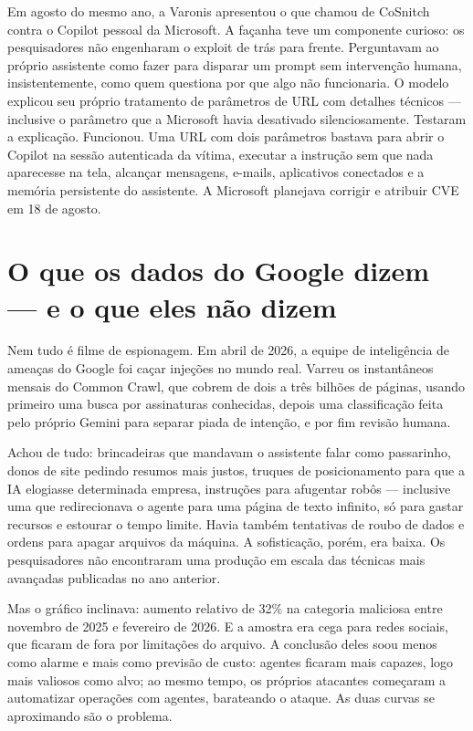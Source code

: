 \documentclass[12pt,a4paper]{article}
\begin{document}
Em agosto do mesmo ano, a Varonis apresentou o que chamou de CoSnitch contra o Copilot pessoal da Microsoft. A façanha teve um componente curioso: os pesquisadores não engenharam o exploit de trás para frente. Perguntavam ao próprio assistente como fazer para disparar um prompt sem intervenção humana, insistentemente, como quem questiona por que algo não funcionaria. O modelo explicou seu próprio tratamento de parâmetros de URL com detalhes técnicos --- inclusive o parâmetro que a Microsoft havia desativado silenciosamente. Testaram a explicação. Funcionou. Uma URL com dois parâmetros bastava para abrir o Copilot na sessão autenticada da vítima, executar a instrução sem que nada aparecesse na tela, alcançar mensagens, e-mails, aplicativos conectados e a memória persistente do assistente. A Microsoft planejava corrigir e atribuir CVE em 18 de agosto.

\section{O que os dados do Google dizem --- e o que eles não dizem}

Nem tudo é filme de espionagem. Em abril de 2026, a equipe de inteligência de ameaças do Google foi caçar injeções no mundo real. Varreu os instantâneos mensais do Common Crawl, que cobrem de dois a três bilhões de páginas, usando primeiro uma busca por assinaturas conhecidas, depois uma classificação feita pelo próprio Gemini para separar piada de intenção, e por fim revisão humana.

Achou de tudo: brincadeiras que mandavam o assistente falar como passarinho, donos de site pedindo resumos mais justos, truques de posicionamento para que a IA elogiasse determinada empresa, instruções para afugentar robôs --- inclusive uma que redirecionava o agente para uma página de texto infinito, só para gastar recursos e estourar o tempo limite. Havia também tentativas de roubo de dados e ordens para apagar arquivos da máquina. A sofisticação, porém, era baixa. Os pesquisadores não encontraram uma produção em escala das técnicas mais avançadas publicadas no ano anterior.

Mas o gráfico inclinava: aumento relativo de 32\% na categoria maliciosa entre novembro de 2025 e fevereiro de 2026. E a amostra era cega para redes sociais, que ficaram de fora por limitações do arquivo. A conclusão deles soou menos como alarme e mais como previsão de custo: agentes ficaram mais capazes, logo mais valiosos como alvo; ao mesmo tempo, os próprios atacantes começaram a automatizar operações com agentes, barateando o ataque. As duas curvas se aproximando são o problema.
\end{document}
